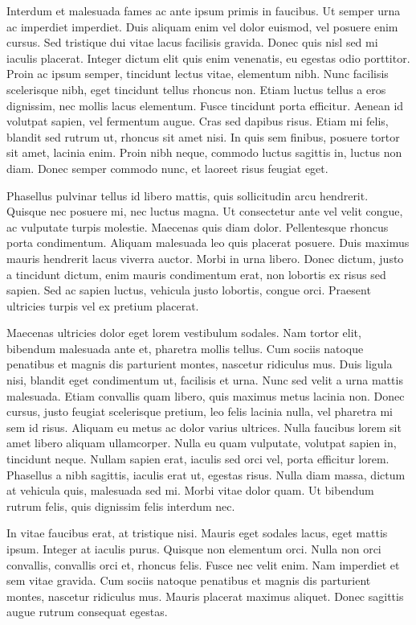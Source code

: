 Interdum et malesuada fames ac ante ipsum primis in faucibus. Ut semper urna ac imperdiet imperdiet. Duis aliquam enim vel dolor euismod, vel posuere enim cursus. Sed tristique dui vitae lacus facilisis gravida. Donec quis nisl sed mi iaculis placerat. Integer dictum elit quis enim venenatis, eu egestas odio porttitor. Proin ac ipsum semper, tincidunt lectus vitae, elementum nibh. Nunc facilisis scelerisque nibh, eget tincidunt tellus rhoncus non. Etiam luctus tellus a eros dignissim, nec mollis lacus elementum. Fusce tincidunt porta efficitur. Aenean id volutpat sapien, vel fermentum augue. Cras sed dapibus risus. Etiam mi felis, blandit sed rutrum ut, rhoncus sit amet nisi. In quis sem finibus, posuere tortor sit amet, lacinia enim. Proin nibh neque, commodo luctus sagittis in, luctus non diam. Donec semper commodo nunc, et laoreet risus feugiat eget.

Phasellus pulvinar tellus id libero mattis, quis sollicitudin arcu hendrerit. Quisque nec posuere mi, nec luctus magna. Ut consectetur ante vel velit congue, ac vulputate turpis molestie. Maecenas quis diam dolor. Pellentesque rhoncus porta condimentum. Aliquam malesuada leo quis placerat posuere. Duis maximus mauris hendrerit lacus viverra auctor. Morbi in urna libero. Donec dictum, justo a tincidunt dictum, enim mauris condimentum erat, non lobortis ex risus sed sapien. Sed ac sapien luctus, vehicula justo lobortis, congue orci. Praesent ultricies turpis vel ex pretium placerat.

Maecenas ultricies dolor eget lorem vestibulum sodales. Nam tortor elit, bibendum malesuada ante et, pharetra mollis tellus. Cum sociis natoque penatibus et magnis dis parturient montes, nascetur ridiculus mus. Duis ligula nisi, blandit eget condimentum ut, facilisis et urna. Nunc sed velit a urna mattis malesuada. Etiam convallis quam libero, quis maximus metus lacinia non. Donec cursus, justo feugiat scelerisque pretium, leo felis lacinia nulla, vel pharetra mi sem id risus. Aliquam eu metus ac dolor varius ultrices. Nulla faucibus lorem sit amet libero aliquam ullamcorper. Nulla eu quam vulputate, volutpat sapien in, tincidunt neque. Nullam sapien erat, iaculis sed orci vel, porta efficitur lorem. Phasellus a nibh sagittis, iaculis erat ut, egestas risus. Nulla diam massa, dictum at vehicula quis, malesuada sed mi. Morbi vitae dolor quam. Ut bibendum rutrum felis, quis dignissim felis interdum nec.

In vitae faucibus erat, at tristique nisi. Mauris eget sodales lacus, eget mattis ipsum. Integer at iaculis purus. Quisque non elementum orci. Nulla non orci convallis, convallis orci et, rhoncus felis. Fusce nec velit enim. Nam imperdiet et sem vitae gravida. Cum sociis natoque penatibus et magnis dis parturient montes, nascetur ridiculus mus. Mauris placerat maximus aliquet. Donec sagittis augue rutrum consequat egestas.

